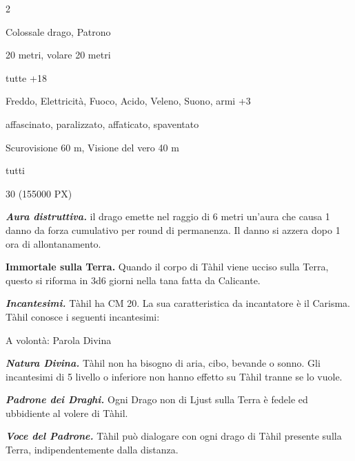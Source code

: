 \begin{multicols}{2}
{
\begin{description}[noitemsep, topsep=0pt, parsep=0pt, partopsep=0pt, itemsep=1pt, leftmargin=2.35cm,  labelwidth=2.2cm, itemindent=0cm, listparindent=0pt] %
\setlength{\baselineskip}{10pt}
\item[\textbf{Taglia/Tipo}] Colossale drago, Patrono
\item[\textbf{Caratt.}] 
\item[\textbf{Punti Ferita}] 
\item[\textbf{Movimento}] 20 metri, volare 20 metri
\item[\textbf{Tiri Salvez.}] 
\item[\textbf{Comp.}] tutte +18
\item[\textbf{Imm. Danni}] Freddo, Elettricità, Fuoco, Acido, Veleno, Suono, armi +3
\item[\textbf{Immunità}] affascinato, paralizzato, affaticato, spaventato
\item[\textbf{Sensi}] Scurovisione 60 m, Visione del vero 40 m
\item[\textbf{Linguaggi}] tutti
\item[\textbf{Sfida}] 30 (155000 PX)
\end{description}
\smallskip

\emph{\textbf{Aura distruttiva.}} il drago emette nel raggio di 6 metri un'aura che causa 1 danno da forza cumulativo per round di permanenza. Il danno si azzera dopo 1 ora di allontanamento.

\textbf{Immortale sulla Terra.} Quando il corpo di Tàhil viene ucciso sulla Terra, questo si riforma in 3d6 giorni nella tana fatta da Calicante.

\emph{\textbf{Incantesimi.}} Tàhil ha CM 20. La sua caratteristica da incantatore è il Carisma. Tàhil conosce i seguenti incantesimi:

A volontà: Parola Divina

\emph{\textbf{Natura Divina.}} Tàhil non ha bisogno di aria, cibo, bevande o sonno. Gli incantesimi di 5 livello o inferiore non hanno effetto su Tàhil tranne se lo vuole.

\emph{\textbf{Padrone dei Draghi.}} Ogni Drago non di Ljust sulla Terra è fedele ed ubbidiente al volere di Tàhil.

\emph{\textbf{Voce del Padrone.}} Tàhil può dialogare con ogni drago di Tàhil presente sulla Terra, indipendentemente dalla distanza.

}
\end{multicols}
